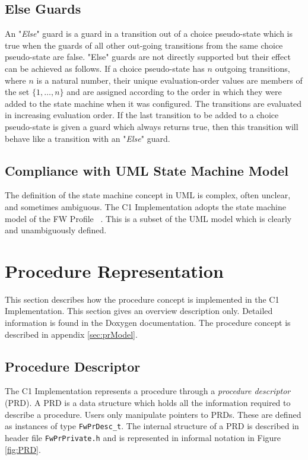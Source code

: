 \documentclass[manual]{../fwprofile}
\begin{document}
\subsection{Else Guards}
An "\emph{Else}" guard is a guard in a transition out of a choice pseudo-state which is true when the guards of 
all other out-going transitions from the same choice pseudo-state are false. "Else" guards are not directly 
supported but their effect can be achieved as follows. If a choice pseudo-state has $n$ outgoing transitions, where $n$ is a natural number,
their unique evaluation-order values are members of the set $\{1,\ldots,n\}$ and are assigned according to the order in which they were added
to the state machine when it was configured. The transitions are evaluated in increasing evaluation order.
If the last transition to be added 
to a choice pseudo-state is given a guard which always returns true, then this transition will behave like 
a transition with an "\emph{Else}" guard.


\subsection{Compliance with UML State Machine Model}
The definition of the state machine concept in UML is complex, often unclear, and sometimes ambiguous. 
The C1 Implementation adopts the state machine model of the FW Profile ~\cite{ref:fwprofile}. 
This is a subset of the UML model which is clearly and unambiguously defined. 



\section{Procedure Representation}
This section describes how the procedure concept is implemented in the C1 Implementation. 
This section gives an overview description only. Detailed information is found in the 
Doxygen documentation. The procedure concept is described in appendix \ref{sec:prModel}.

\subsection{Procedure Descriptor}\label{sec:prDesc}
The C1 Implementation represents a procedure through a \emph{procedure descriptor} (PRD). 
A PRD is a data structure which holds all the information required to describe a procedure. 
Users only manipulate pointers to PRDs. These are defined as instances of type \texttt{FwPrDesc\_t}. The internal structure of a PRD is described 
in header file \texttt{FwPrPrivate.h} and is represented in informal notation in Figure \ref{fig:PRD}. 
\end{document}
